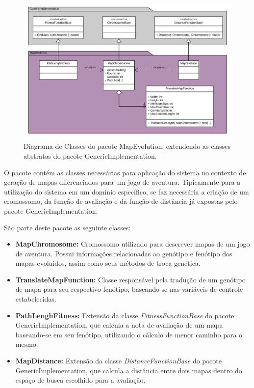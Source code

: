\begin{figure}[htb]
	\begin{center}
		\includegraphics[width=1.0\textwidth]{Imagens/dev_map_evolution_class_diagram.png}
		\caption{Diagrama de Classes do pacote MapEvolution, extendendo as classes abstratas do pacote GenericImplementation.}
		\label{fig:dev_map_evolution_class_diagram}
	\end{center}
\end{figure}

O pacote contém as classes necessárias para aplicação do sistema no contexto de geração de mapas diferenciados para um jogo de aventura. Tipicamente para a utilização do sistema em um domínio específico, se faz necessária a criação de um cromossomo, da função de avaliação e da função de distância já expostas pelo pacote GenericImplementation.

São parte deste pacote as seguinte classes:
\vspace{-5mm}
\begin{itemize}[leftmargin=1.25\parindent]
    \item \textbf{MapChromosome:} Cromossomo utilizado para descrever mapas de um jogo de aventura. Possui informações relacionadas ao genótipo e fenótipo dos mapas evoluídos, assim como seus métodos de troca genética.
    \item \textbf{TranslateMapFunction:} Classe responsável pela tradução de um genótipo de mapa para seu respectivo fenótipo, baseando-se nas variáveis de controle estabelecidas.
    \item \textbf{PathLenghFitness:} Extensão da classe \emph{FitnessFunctionBase} do pacote GenericImplementation, que calcula a nota de avaliação de um mapa ba\-se\-an\-do-se em seu fenótipo, utilizando o cálculo de menor caminho para o mesmo.
    \item \textbf{MapDistance:} Extensão da classe \emph{DistanceFunctionBase} do pacote GenericImplementation, que calcula a distância entre dois mapas dentro do espaço de busca escolhido para a avaliação.
\end{itemize}